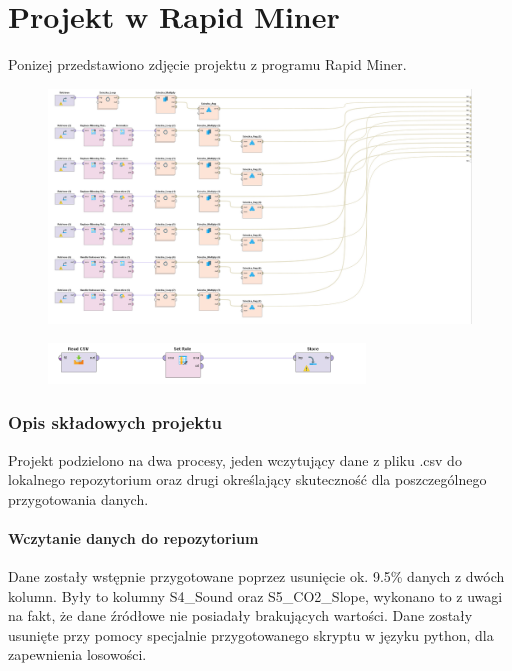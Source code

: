 \documentclass[12pt,oneside,a4paper]{book} %
\theoremstyle{break}
\begin{document}
\chapter*{Projekt w Rapid Miner}

Ponizej przedstawiono zdjęcie projektu z programu Rapid Miner.

\begin{figure}[H]
  \centering
  \includegraphics[width=1\textwidth]{whole-project.png}
\end{figure}
\begin{figure}[H]
  \centering
  \includegraphics[width=0.75\textwidth]{loading-project.png}
\end{figure}

\subsection*{Opis składowych projektu}

Projekt podzielono na dwa procesy, jeden wczytujący dane z pliku .csv do lokalnego repozytorium oraz drugi określający skuteczność dla poszczególnego przygotowania danych.

\subsubsection*{Wczytanie danych do repozytorium}

Dane zostały wstępnie przygotowane poprzez usunięcie ok. 9.5\% danych z dwóch kolumn.
Były to kolumny S4\_Sound oraz S5\_CO2\_Slope, wykonano to z uwagi na fakt, że dane źródłowe nie posiadały brakujących wartości. Dane zostały usunięte przy pomocy specjalnie przygotowanego skryptu w języku python, dla zapewnienia losowości.
\end{document}
